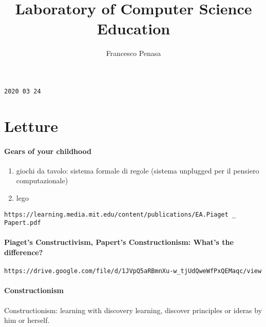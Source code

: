 \documentclass[11pt]{article}
\begin{document}
\author{Francesco Penasa}
\title{Laboratory of Computer Science Education}
\maketitle

\medskip

\texttt{2020 03 24}

\section{Letture} %
\label{sec:letture}
\paragraph{Gears of your childhood} %
\label{par:gears_of_your_childhood}
\begin{enumerate}
	\item giochi da tavolo: sistema formale di regole (sistema unplugged per il pensiero computazionale)
	\item lego
	
\end{enumerate}


\texttt{https://learning.media.mit.edu/content/publications/EA.Piaget \_ Papert.pdf}
\paragraph{Piaget’s Constructivism, Papert’s Constructionism: What’s the difference?} %
\label{par:Constructivism}


\texttt{https://drive.google.com/file/d/1JVpQ5aRBmnXu-w\_tjUdQweWfPxQEMaqc/view}
\paragraph{Constructionism} %
\label{par:Constructionism}
Constructionism: learning with discovery learning, discover principles or ideras by him or herself.

\end{document}
